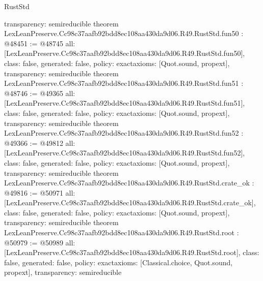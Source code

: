 \begin{lexlean}{RustStd}
\begin{coremodule}
{  transparency: semireducible
}
theorem LexLeanPreserve.Cc98c37aafb92bdd8ec108aa430da9d06.R49.RustStd.fun50 : @48451 := @48745 {
  all: [LexLeanPreserve.Cc98c37aafb92bdd8ec108aa430da9d06.R49.RustStd.fun50],
  class: false,
  generated: false,
  policy: exact{axioms: [Quot.sound, propext]},
  transparency: semireducible
}
theorem LexLeanPreserve.Cc98c37aafb92bdd8ec108aa430da9d06.R49.RustStd.fun51 : @48746 := @49365 {
  all: [LexLeanPreserve.Cc98c37aafb92bdd8ec108aa430da9d06.R49.RustStd.fun51],
  class: false,
  generated: false,
  policy: exact{axioms: [Quot.sound, propext]},
  transparency: semireducible
}
theorem LexLeanPreserve.Cc98c37aafb92bdd8ec108aa430da9d06.R49.RustStd.fun52 : @49366 := @49812 {
  all: [LexLeanPreserve.Cc98c37aafb92bdd8ec108aa430da9d06.R49.RustStd.fun52],
  class: false,
  generated: false,
  policy: exact{axioms: [Quot.sound, propext]},
  transparency: semireducible
}
theorem LexLeanPreserve.Cc98c37aafb92bdd8ec108aa430da9d06.R49.RustStd.crate_ok : @49816 := @50971 {
  all: [LexLeanPreserve.Cc98c37aafb92bdd8ec108aa430da9d06.R49.RustStd.crate_ok],
  class: false,
  generated: false,
  policy: exact{axioms: [Quot.sound, propext]},
  transparency: semireducible
}
theorem LexLeanPreserve.Cc98c37aafb92bdd8ec108aa430da9d06.R49.RustStd.root : @50979 := @50989 {
  all: [LexLeanPreserve.Cc98c37aafb92bdd8ec108aa430da9d06.R49.RustStd.root],
  class: false,
  generated: false,
  policy: exact{axioms: [Classical.choice, Quot.sound, propext]},
  transparency: semireducible
}


\end{coremodule}
\end{lexlean}
